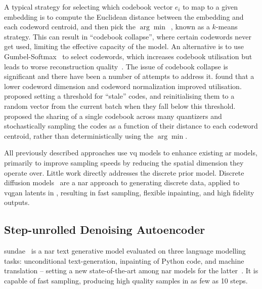 A typical strategy for selecting which codebook vector $e_i$ to map to a given
embedding is to compute the Euclidean distance between the embedding and each
codeword centroid, and then pick the $\arg\min$~\cite{oord2017vqvae}, known as a
$k$-means strategy. This can result in ``codebook collapse'', where certain
codewords never get used, limiting the effective capacity of the model. An
alternative is to use Gumbel-Softmax~\cite{jang2016gumbel} to select codewords,
which increases codebook utilisation but leads to worse reconstruction
quality~\cite{bondtaylor2021unleashing}.
The issue of codebook collapse is significant and there have been a number
of attempts to address it. \cite{yu2021vqgan} found that a lower codeword
dimension and codeword normalization improved utilisation.
\cite{zeghidour2021soundstream} proposed setting a threshold for ``stale'' codes,
and reinitialising them to a random vector from the current batch when they
fall below this threshold. \cite{lee2022rqvae} proposed the sharing of a single
codebook across many quantizers and stochastically sampling the
codes as a function of their distance to each codeword centroid, rather than
deterministically using the $\arg\min$.

All previously described approaches use \gls{vq} models to enhance existing
\gls{ar} models, primarily to improve sampling speeds by reducing the spatial
dimension they operate over. Little work directly addresses the discrete prior
model. Discrete diffusion models~\cite{austin2021structured} are a \gls{nar}
approach to generating discrete data, applied to \gls{vqgan} latents in
\citet{bondtaylor2021unleashing}, resulting in fast sampling, flexible
inpainting, and high fidelity outputs.

\subsection{Step-unrolled Denoising Autoencoder}
\label{subsec:sundae}

\Gls{sundae}~\cite{savinov2022stepunrolled} is a \gls{nar} text generative model
evaluated on three language modelling tasks: unconditional text-generation,
inpainting of Python code, and machine translation -- setting a new
state-of-the-art among \gls{nar} models for the
latter~\cite{savinov2022stepunrolled}. It is capable of fast sampling, producing
high quality samples in as few as 10 steps.

